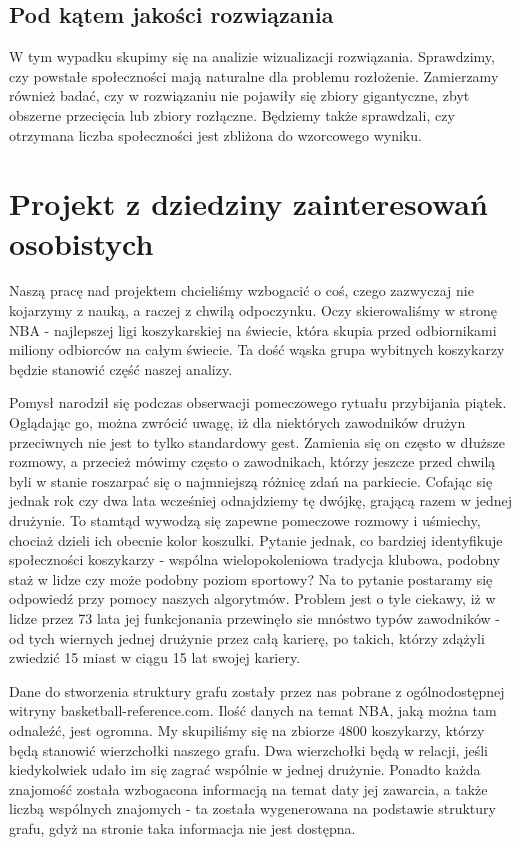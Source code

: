 \documentclass{article}
\begin{document}
\subsection{Pod kątem jakości rozwiązania}
W tym wypadku skupimy się na analizie wizualizacji rozwiązania. Sprawdzimy, czy powstałe społeczności mają naturalne dla problemu rozłożenie. Zamierzamy również badać, czy w rozwiązaniu nie pojawiły się zbiory gigantyczne, zbyt obszerne przecięcia  lub zbiory rozłączne. Będziemy także sprawdzali, czy otrzymana liczba społeczności jest zbliżona do wzorcowego wyniku.

\newpage
\section{Projekt z dziedziny zainteresowań osobistych}
Naszą pracę nad projektem chcieliśmy wzbogacić o coś, czego zazwyczaj nie kojarzymy z nauką, a raczej z chwilą odpoczynku. Oczy skierowaliśmy w stronę NBA - najlepszej ligi koszykarskiej na świecie, która skupia przed odbiornikami miliony odbiorców na całym świecie. Ta dość wąska grupa wybitnych koszykarzy będzie stanowić część naszej analizy.

Pomysł narodził się podczas obserwacji pomeczowego rytuału przybijania piątek. Oglądając go, można zwrócić uwagę, iż dla niektórych zawodników drużyn przeciwnych nie jest to tylko standardowy gest. Zamienia się on często w dłuższe rozmowy, a przecież mówimy często o zawodnikach, którzy jeszcze przed chwilą byli w stanie roszarpać się o najmniejszą różnicę zdań na parkiecie. Cofając się jednak rok czy dwa lata wcześniej odnajdziemy tę dwójkę, grającą razem w jednej drużynie. To stamtąd wywodzą się zapewne pomeczowe rozmowy i uśmiechy, chociaż dzieli ich obecnie kolor koszulki. Pytanie jednak, co bardziej identyfikuje społeczności koszykarzy - wspólna wielopokoleniowa tradycja klubowa, podobny staż w lidze czy może podobny poziom sportowy? Na to pytanie postaramy się odpowiedź przy pomocy naszych algorytmów. Problem jest o tyle ciekawy, iż w lidze przez 73 lata jej funkcjonania przewinęło sie mnóstwo typów zawodników - od tych wiernych jednej drużynie przez całą karierę, po takich, którzy zdążyli zwiedzić 15 miast w ciągu 15 lat swojej kariery.

Dane do stworzenia struktury grafu zostały przez nas pobrane z ogólnodostępnej witryny basketball-reference.com. Ilość danych na temat NBA, jaką można tam odnaleźć, jest ogromna. My skupiliśmy się na zbiorze 4800 koszykarzy, którzy będą stanowić wierzchołki naszego grafu. Dwa wierzchołki będą w relacji, jeśli kiedykolwiek udało im się zagrać wspólnie w jednej drużynie. Ponadto każda znajomość została wzbogacona informacją na temat daty jej zawarcia, a także liczbą wspólnych znajomych - ta została wygenerowana na podstawie struktury grafu, gdyż na stronie taka informacja nie jest dostępna.
\end{document}
